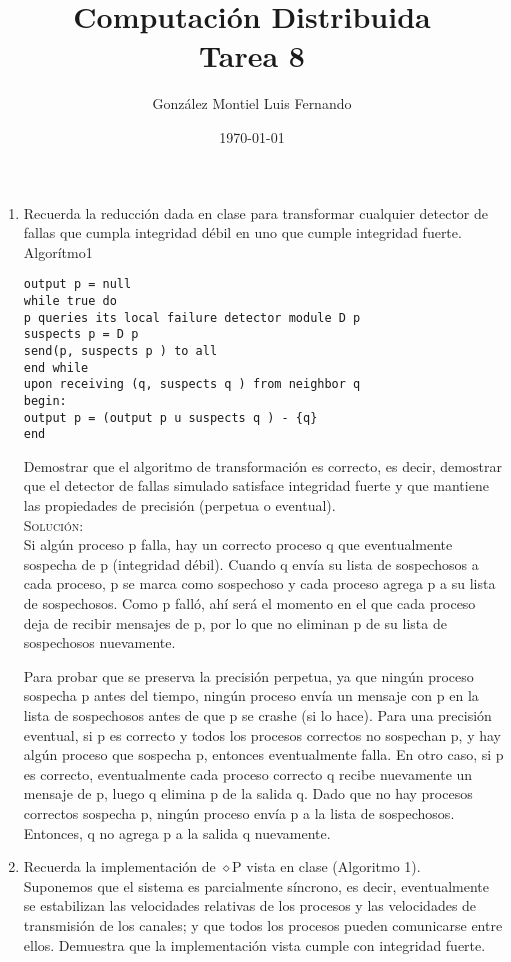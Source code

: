\documentclass[letterpaper,10pt]{article}
\title{Computación Distribuida \\ Tarea 8}
\author{González Montiel Luis Fernando \\}
\date{\today}
\begin{document}
\maketitle

	\begin{enumerate}

    \item Recuerda la reducción dada en clase para transformar cualquier detector de fallas que cumpla integridad débil en uno que cumple integridad fuerte.\\
    Algorítmo1
    \begin{lstlisting}
output p = null
while true do
p queries its local failure detector module D p
suspects p = D p
send(p, suspects p ) to all
end while
upon receiving (q, suspects q ) from neighbor q
begin:
output p = (output p u suspects q ) - {q}
end
	\end{lstlisting}
   
Demostrar que el algoritmo de transformación es correcto, es decir, demostrar que el detector de fallas simulado satisface integridad fuerte y que mantiene las propiedades de precisión (perpetua o eventual).\\
   
    \textsc{Solución:}
    \\  
    Si algún proceso p falla, hay un correcto proceso q que eventualmente sospecha de p (integridad débil). Cuando q envía su lista de sospechosos a cada proceso, p se marca como sospechoso y cada proceso agrega p a su lista de sospechosos. Como p falló, ahí será el momento en el que cada proceso deja de recibir mensajes de p, por lo que no eliminan p de su lista de sospechosos nuevamente.

Para probar que se preserva la precisión perpetua, ya que ningún proceso sospecha p antes del tiempo, ningún proceso envía un mensaje con p en la lista de sospechosos antes de que p se crashe (si lo hace). Para una precisión eventual, si p es correcto y todos los procesos correctos no sospechan p, y hay algún proceso que sospecha p, entonces eventualmente falla. En otro caso, si p es correcto, eventualmente cada proceso correcto q recibe nuevamente un mensaje de p, luego q elimina p de la salida q. Dado que no hay procesos correctos sospecha p, ningún proceso envía p a la lista de sospechosos. Entonces, q no agrega p a la salida q nuevamente.

    \item Recuerda la implementación de $\diamond$P vista en clase (Algoritmo 1).\\
Suponemos que el sistema es parcialmente síncrono, es decir, eventualmente se estabilizan las velocidades relativas de los procesos y las velocidades de transmisión de los canales; y que todos los procesos pueden comunicarse entre ellos.
Demuestra que la implementación vista cumple con integridad fuerte.
\\
    

\end{enumerate}
\end{document}
